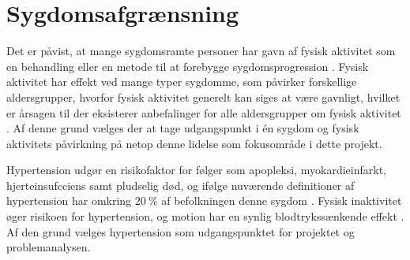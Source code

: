 \section{Sygdomsafgrænsning}
Det er påvist, at mange sygdomsramte personer har gavn af fysisk aktivitet som en behandling eller en metode til at forebygge sygdomsprogression \cite{motionsraad2007,pedersen2011}. Fysisk aktivitet har effekt ved mange typer sygdomme, som påvirker forskellige aldersgrupper, hvorfor fysisk aktivitet generelt kan siges at være gavnligt, hvilket er årsagen til der eksisterer anbefalinger for alle aldersgrupper om fysisk aktivitet \cite{pedersen2011}. Af denne grund vælges der at tage udgangspunkt i én sygdom og fysisk aktivitets påvirkning på netop denne lidelse som fokusområde i dette projekt.

Hypertension udgør en risikofaktor for følger som apopleksi, myokardieinfarkt, hjerteinsufcciens samt pludselig død, og ifølge nuværende definitioner af hypertension har omkring $20~\%$ af befolkningen denne sygdom \cite{pedersen2011}. Fysisk inaktivitet øger risikoen for hypertension, og motion har en synlig blodtrykssænkende effekt \cite{olsen2015}. Af den grund vælges hypertension som udgangspunktet for projektet og problemanalysen. 